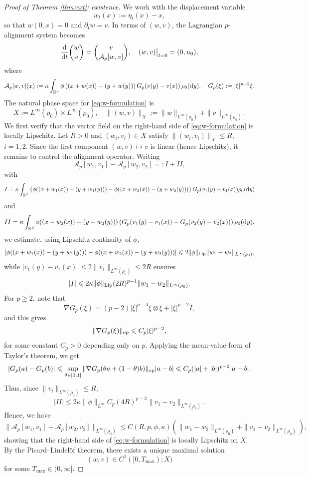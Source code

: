 \documentclass[10pt,reqno]{amsart}
\renewcommand{\ge}{\geqslant}
\renewcommand{\le}{\leqslant}
\numberwithin{equation}{section}
\newcommand{\R}{\mathbb R}
\newcommand{\bq}{\begin{equation}}
\newcommand{\eq}{\end{equation}}
\newcommand{\lt}{\left}
\newcommand{\rt}{\right}
\newcommand{\pa}{\partial}
\newcommand{\intr}{\int_{\R^d}}
\newcommand{\calA}{\mathcal A}
\newcommand{\rd}{\textnormal{d}}
\newcommand{\dt}{\textnormal{d}t}
\newcommand{\dy}{\textnormal{d}y}
\begin{document}
\begin{proof}[Proof of Theorem \ref{thm:ext}: existence]
We work with the displacement variable
\[
w_t(x):=\eta_t(x)-x,
\]
so that $w(0,x)=0$ and $\pa_t w=v$. In terms of $(w,v)$, the Lagrangian $p$-alignment system becomes 
\bq\label{eq:w-formulation}
\frac{\rd}{\dt} \binom{w}{v} = \binom{v}{\calA_p[w,v]},
\quad
(w,v)\big|_{t=0}=(0,u_0),
\eq
where
\[
\calA_p[w,v](x) :=\kappa\intr \phi\lt((x+w(x))-(y+w(y))\rt) G_p(v(y)-v(x))\,\rho_0(\dy), \quad  G_p(\xi):=|\xi|^{p-2}\xi.
\]
The natural phase space for \eqref{eq:w-formulation} is 
\[
X:=L^\infty(\rho_0)\times L^\infty(\rho_0), \quad  \|(w,v)\|_X:=\|w\|_{L^\infty(\rho_0)}+\|v\|_{L^\infty(\rho_0)}.
\]
We first verify that the vector field on the right-hand side of \eqref{eq:w-formulation} is locally Lipschitz. Let $R>0$ and $(w_i,v_i)\in X$ satisfy $\|(w_i,v_i)\|_X \le R$, $i=1,2$. Since the first component $(w,v)\mapsto v$ is linear (hence Lipschitz), it remains to control the alignment operator. Writing
\[
\calA_p[w_1,v_1] - \calA_p[w_2,v_2] =: I + II,
\]
with
\[
I = \kappa\intr \lt\{\phi((x+w_1(x))-(y+w_1(y))) - \phi((x+w_2(x))-(y+w_2(y))) \rt\}  G_p(v_1(y)-v_1(x))\rho_0(\dy)
\]
and
\[
II = \kappa\intr   \phi((x+w_2(x))-(y+w_2(y))) \lt(  G_p(v_1(y)-v_1(x)) - G_p(v_2(y)-v_2(x))\rt) \rho_0(\dy),
\]
we estimate, using Lipschitz continuity of $\phi$,  
\[
|\phi((x+w_1(x))-(y+w_1(y))) - \phi((x+w_2(x))-(y+w_2(y)))|\le 2 \|\phi\|_{\rm Lip} \|w_1-w_2\|_{L^\infty(\rho_0)},
\]
while $|v_1(y)-v_1(x)|\le 2\|v_1\|_{L^\infty(\rho_0)} \le 2R$ ensures
\[
|I| \le 2\kappa \|\phi\|_{\rm Lip} (2R)^{p-1} \|w_1-w_2\|_{L^\infty(\rho_0)}.
\]
For $p\ge2$, note that 
\[
\nabla G_p(\xi) =(p-2)|\xi|^{p-4}\xi\otimes\xi + |\xi|^{p-2}I, 
\]
and this gives
\[
\|\nabla G_p(\xi)\|_{\rm op} \le C_p |\xi|^{p-2},
\]
for some constant $C_p>0$ depending only on $p$. Applying the mean-value form of Taylor's theorem, we get
\[
|G_p(a)-G_p(b)| \le \sup_{\theta\in[0,1]}\|\nabla G_p(\theta a+ (1-\theta) b)\|_{\rm op} |a-b| \le C_p (|a|+|b|)^{p-2}|a-b|.
\]
Thus, since $\|v_i\|_{L^\infty(\rho_0)} \le R$,
\[
|II| \le 2 \kappa \|\phi\|_{L^\infty} C_p (4R)^{p-2} \|v_1-v_2\|_{L^\infty(\rho_0)}.
\]
Hence, we have
\[
\|\calA_p[w_1,v_1]-\calA_p[w_2,v_2]\|_{L^\infty(\rho_0)} \le C(R,p,\phi,\kappa)\lt(\|w_1-w_2\|_{L^\infty(\rho_0)} + \|v_1-v_2\|_{L^\infty(\rho_0)}\rt),
\]
showing that the right-hand side of \eqref{eq:w-formulation} is locally Lipschitz on $X$. By the Picard--Lindel\"of theorem, there exists a unique maximal solution
\[
(w,v)\in C^1([0,T_{\max});X)
\]
for some $T_{\max}\in(0,\infty]$.


\end{proof}
\end{document}
